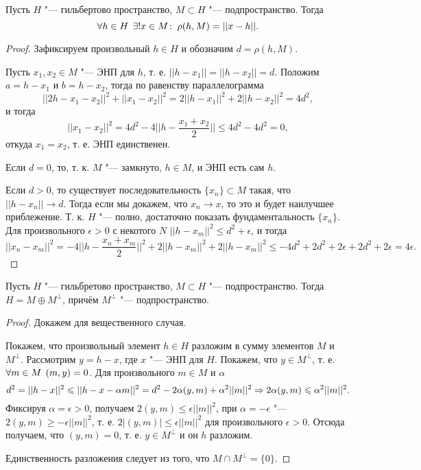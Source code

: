 \documentclass[main]{subfiles}
\begin{document}
\begin{lemma}
  Пусть \( H \) "--- гильбертово пространство, \( M \subset H \) "---
  подпространство. Тогда
  \[ \forall {h \in H} \; \, \exists! x \in M \colon \: \rho(h, M) = ||x - h||. \]
\end{lemma}
\begin{proof}
  Зафиксируем произвольный \( h \in H \) и обозначим \( d = \rho(h, M) \).

  Пусть \( x_1, x_2 \in M \) "--- ЭНП для \( h \), т. е.
  \( ||h - x_1|| = ||h - x_2|| = d \).
  Положим \( a = h - x_1 \) и \( b = h - x_2 \),
  тогда по равенству параллелограмма
  \[ ||2h - x_1 - x_2||^2 + ||x_1 - x_2||^2 =
  2||h - x_1||^2 + 2 ||h - x_2||^2 = 4 d^2, \]
  и тогда
  \[ ||x_1 - x_2||^2 = 4d^2 - 4 ||h - \frac{x_1 + x_2}{2}||
  \le 4d^2 - 4d^2 = 0, \]
  откуда \( x_1 = x_2 \), т. е. ЭНП единственен.

  Если \( d = 0 \), то, т. к. \( M \) "--- замкнуто,
  \( h \in M \), и ЭНП есть сам \( h \).

  Если \( d > 0 \), то существует последовательность
  \( \{ x_n \} \subset M \) такая, что
  \( ||h - x_n|| \to d \). Тогда если мы докажем,
  что \( x_n \to x \), то это и будет наилучшее приблежение.
  Т. к. \( H \) "--- полно, достаточно показать фундаментальность
  \( \{ x_n \} \). Для произвольного \( \epsilon > 0 \)
  с некотого \( N \) \( ||h - x_m||^2 \le d^2 + \epsilon \),
  и тогда
  \[ ||x_n - x_m||^2 = -4 ||h - \frac{x_n + x_m}{2}||^2
    + 2 ||h - x_m||^2 + 2||h - x_m||^2 \le
    -4 d^2 + 2d^2 + 2\epsilon + 2d^2 + 2\epsilon =
    4 \epsilon. \]
\end{proof}


\begin{theorem}[о проекции]%
  Пусть \( H \) "--- гильбретово пространство, \( M \subset H \) "---
  подпространство. Тогда \( H = M \oplus M^\perp \),
  причём \( M^\perp \) "--- подпространство.
\end{theorem}
\begin{proof}
  Докажем для вещественного случая.

  Покажем, что произвольный элемент \( h \in H \) разложим
  в сумму элементов \( M \) и \( M^\perp \).
  Рассмотрим \( y = h - x \), где \( x \) "--- ЭНП для \( H \).
  Покажем, что \( y \in M^\perp \), т. е. \( \forall {m \in M} \; \, (m, y) = 0 \).
  Для произвольного \( m \in M \) и \( \alpha \)
  \[ d^2 = ||h - x||^2 \leqslant ||h - x - \alpha m||^2 =
  d^2 - 2 \alpha (y, m) + \alpha^2 ||m||^2 \Rightarrow
  2 \alpha (y, m) \leqslant \alpha^2 ||m||^2. \]
  Фиксируя \( \alpha = \epsilon > 0 \), получаем \( 2 (y, m) \le \epsilon ||m||^2 \),
  при \( \alpha = -\epsilon \) "--- \( 2 (y, m) \ge -\epsilon ||m||^2 \),
  т. е. \( 2 |(y, m)| \le \epsilon ||m||^2 \) для произвольного \( \epsilon > 0 \).
  Отсюда получаем, что \( (y, m) = 0 \), т. е. \( y \in M^\perp \)
  и он \( h \) разложим.

  Единственность разложения следует из того, что \( M \cap M^\perp = \{ 0 \} \).
\end{proof}
\end{document}
